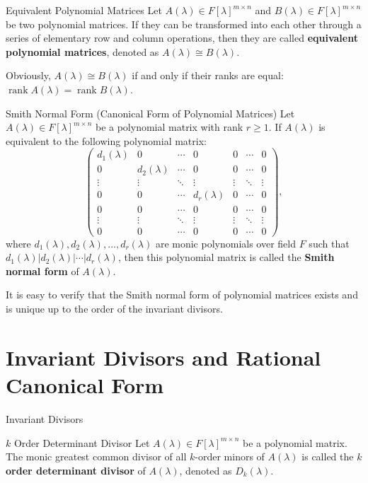 \documentclass[11pt]{../../TexTemplate/elegantbook} %
\begin{document}
\begin{definition}{Equivalent Polynomial Matrices}
    Let \( A(\lambda) \in F[\lambda]^{m \times n} \) and \( B(\lambda) \in F[\lambda]^{m \times n} \) be two polynomial matrices.
    If they can be transformed into each other through a series of elementary row and column operations,
    then they are called \textbf{equivalent polynomial matrices}, denoted as \( A(\lambda) \cong B(\lambda) \).
\end{definition}
\begin{note}
    Obviously, \( A(\lambda) \cong B(\lambda) \) if and only if 
    their ranks are equal: \( \operatorname{rank} A(\lambda) = \operatorname{rank} B(\lambda) \).
\end{note}

\begin{definition}{Smith Normal Form (Canonical Form of Polynomial Matrices)}
    Let \( A(\lambda) \in F[\lambda]^{m \times n} \) be a polynomial matrix with rank \( r \geqslant 1 \).
    If \( A(\lambda) \) is equivalent to the following polynomial matrix:
    \[
    \begin{pmatrix}
        d_1(\lambda) & 0 & \cdots & 0 & 0 & \cdots & 0 \\
        0 & d_2(\lambda) & \cdots & 0 & 0 & \cdots & 0 \\
        \vdots & \vdots & \ddots & \vdots & \vdots & \ddots & \vdots \\
        0 & 0 & \cdots & d_r(\lambda) & 0 & \cdots & 0 \\
        0 & 0 & \cdots & 0 & 0 & \cdots & 0 \\
        \vdots & \vdots & \ddots & \vdots & \vdots & \ddots & \vdots \\
        0 & 0 & \cdots & 0 & 0 & \cdots & 0
    \end{pmatrix},
    \]
    where \( d_1(\lambda), d_2(\lambda), \dots, d_r(\lambda) \) are monic polynomials over field \( F \)
    such that \( d_1(\lambda) | d_2(\lambda) | \cdots | d_r(\lambda) \),
    then this polynomial matrix is called the \textbf{Smith normal form} of \( A(\lambda) \).
\end{definition}
It is easy to verify that the Smith normal form of polynomial matrices exists and 
is unique up to the order of the invariant divisors.


\section{Invariant Divisors and Rational Canonical Form}
\begin{leftbarTitle}{Invariant Divisors}\end{leftbarTitle}
\begin{definition}{\(k\) Order Determinant Divisor}
    Let \( A(\lambda) \in F[\lambda]^{m \times n} \) be a polynomial matrix.
    The monic greatest common divisor of all \( k \)-order minors of \( A(\lambda) \) 
    is called the \textbf{\( k \) order determinant divisor} of \( A(\lambda) \),
    denoted as \( D_k(\lambda) \).
\end{definition}
\end{document}
